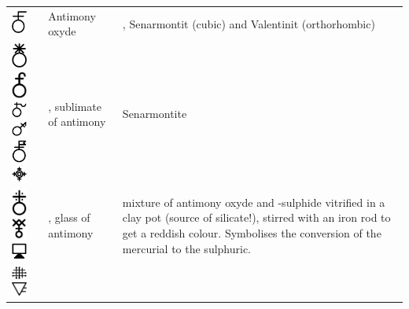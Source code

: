 \documentclass[british,final,landscape]{scrartcl}
\begin{document}
\begin{refsection}
\begin{supertabular}{p{0.3\textwidth}p{0.34\textwidth}p{0.34\textwidth}}
   \includegraphics[width=5mm]{Compounds/AntimonyOxyde} & Antimony oxyde & , Senarmontit (cubic) and Valentinit (orthorhombic)\\
   \includegraphics[width=5mm]{Compounds/AntimonySublimate} \includegraphics[width=5mm]{Compounds/AntimonySublimate2} \includegraphics[width=5mm]{Compounds/AntimonySublimate3} \includegraphics[width=5mm]{Compounds/AntimonySublimate4} \includegraphics[width=5mm]{Compounds/AntimonySublimate5} \includegraphics[width=5mm]{Compounds/AntimonySublimate6} & , sublimate of antimony & Senarmontite  \\
   \includegraphics[width=5mm]{Compounds/AntimonyVitrum} \includegraphics[width=5mm]{Compounds/AntimonyVitrum2} \includegraphics[width=5mm]{Compounds/AntimonyVitrum3} & , glass of antimony & mixture of antimony oxyde and -sulphide vitrified in a clay pot (source of silicate!), stirred with an iron rod to get a reddish colour. Symbolises the conversion of the mercurial to the sulphuric. \\
   \includegraphics[width=5mm]{Compounds/AquaForte} \includegraphics[width=5mm]{Compounds/AquaForte2}

\end{supertabular}
\end{refsection}
\end{document}
